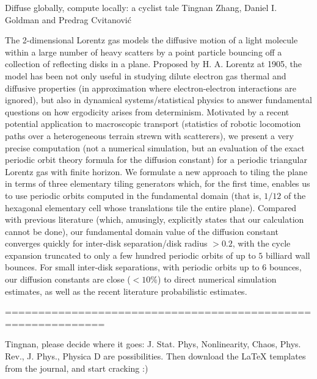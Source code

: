 Diffuse globally, compute locally: a cyclist tale
Tingnan Zhang, Daniel I. Goldman and Predrag Cvitanovi\'c

The 2-dimensional Lorentz gas models the diffusive motion of a light
molecule within a large number of heavy scatters by a point particle
bouncing off a collection of reflecting disks in a plane. Proposed by H.
A. Lorentz at 1905, the model has been not only useful in studying dilute
electron gas thermal and diffusive properties (in approximation where
electron-electron interactions are ignored), but also in dynamical
systems/statistical physics to answer fundamental questions on how
ergodicity arises from determinism. Motivated by a recent potential
application to macroscopic transport (statistics of robotic locomotion
paths over a heterogeneous terrain strewn with scatterers), we present a
very precise computation (not a numerical simulation, but an evaluation
of the exact periodic orbit theory formula for the diffusion constant)
for a periodic triangular Lorentz gas with finite horizon. We formulate a
new approach to tiling the plane in terms of three elementary tiling
generators which, for the first time, enables us to use periodic orbits
computed in the fundamental domain (that is, $1/12$ of the hexagonal
elementary cell whose translations tile the entire plane). Compared with
previous literature (which, amusingly, explicitly states that our
calculation cannot be done), our fundamental domain value of the
diffusion constant converges quickly for inter-disk separation/disk
radius $>0.2$, with the cycle expansion truncated to only a few hundred
periodic orbits of up to $5$ billiard wall bounces. For small inter-disk
separations, with periodic orbits up to $6$ bounces, our diffusion
constants are close ($<10\%$) to direct numerical simulation estimates,
as well as the recent literature probabilistic estimates.




=============================================================

Tingnan, please decide where it goes:
 J. Stat. Phys, Nonlinearity, Chaos, Phys. Rev., J. Phys., Physica D are
 possibilities. Then download the LaTeX templates from the journal, and
 start cracking :)
